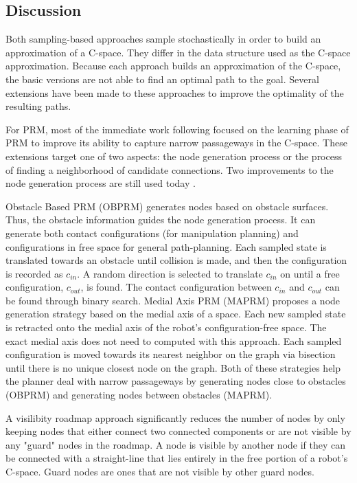 \documentclass[10pt,conference]{ieeeconf}
\begin{document}
\subsection{Discussion}

Both sampling-based approaches sample stochastically in order to build an approximation of a C-space. They differ in the data structure used as the C-space approximation. Because each approach builds an approximation of the C-space, the basic versions are not able to find an optimal path to the goal. Several extensions have been made to these approaches to improve the optimality of the resulting paths.

For PRM, most of the immediate work following \cite{PRM} focused on the learning phase of PRM to improve its ability to capture narrow passageways in the C-space. These extensions target one of two aspects: the node generation process or the process of finding a neighborhood of candidate connections. Two improvements to the node generation process are still used today \cite{amato1998obprm,wilmarth1999maprm}. 


Obstacle Based PRM (OBPRM) \cite{amato1998obprm} generates nodes based on obstacle surfaces. Thus, the obstacle information guides the node generation process. It can generate both contact configurations (for manipulation planning) and configurations in free space for general path-planning. Each sampled state is translated towards an obstacle until collision is made, and then the configuration is recorded as $c_{in}$. A random direction is selected to translate $c_{in}$ on until a free configuration, $c_{out}$, is found. The contact configuration between $c_{in}$ and $c_{out}$ can be found through binary search.
Medial Axis PRM (MAPRM) \cite{wilmarth1999maprm} proposes a node generation strategy based on the medial axis of a space. Each new sampled state is retracted onto the medial axis of the robot's configuration-free space. The exact medial axis does not need to computed with this approach. Each sampled configuration is moved towards its nearest neighbor on the graph via bisection until there is no unique closest node on the graph. Both of these strategies help the planner deal with narrow passageways by generating nodes close to obstacles (OBPRM) and generating nodes between obstacles (MAPRM).

A visilibity roadmap approach \cite{nissoux1999visibility} significantly reduces the number of nodes by only keeping nodes that either connect two connected components or are not visible by any "guard" nodes in the roadmap. A node is visible by another node if they can be connected with a straight-line that lies entirely in the free portion of a robot's C-space. Guard nodes are ones that are not visible by other guard nodes. 
\end{document}
